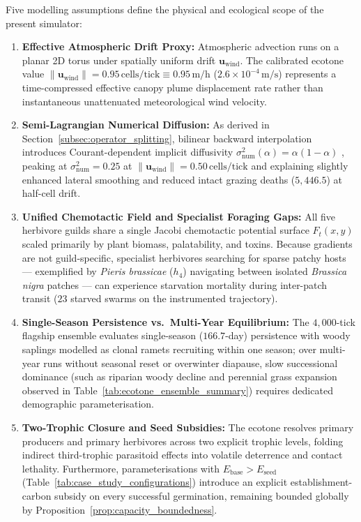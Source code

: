 Five modelling assumptions define the physical and ecological scope of the present simulator:
\begin{enumerate}
  \item \textbf{Effective Atmospheric Drift Proxy:} Atmospheric advection runs on a planar 2D torus under spatially uniform drift $\mathbf{u}_{\text{wind}}$. The calibrated ecotone value $\|\mathbf{u}_{\text{wind}}\| = 0.95\,\text{cells/tick} \equiv 0.95\,\text{m/h}$ ($2.6 \times 10^{-4}\,\text{m/s}$) represents a time-compressed effective canopy plume displacement rate rather than instantaneous unattenuated meteorological wind velocity.
  \item \textbf{Semi-Lagrangian Numerical Diffusion:} As derived in Section~\ref{subsec:operator_splitting}, bilinear backward interpolation introduces Courant-dependent implicit diffusivity $\sigma_{\text{num}}^2(\alpha) = \alpha(1 - \alpha)$ \cite{staniforth1991semi}, peaking at $\sigma_{\text{num}}^2 = 0.25$ at $\|\mathbf{u}_{\text{wind}}\| = 0.50\,\text{cells/tick}$ and explaining slightly enhanced lateral smoothing and reduced intact grazing deaths ($5{,}446.5$) at half-cell drift.
  \item \textbf{Unified Chemotactic Field and Specialist Foraging Gaps:} All five herbivore guilds share a single Jacobi chemotactic potential surface $F_t(x, y)$ scaled primarily by plant biomass, palatability, and toxins. Because gradients are not guild-specific, specialist herbivores searching for sparse patchy hosts --- exemplified by \textit{Pieris brassicae} ($h_4$) navigating between isolated \textit{Brassica nigra} patches --- can experience starvation mortality during inter-patch transit ($23$ starved swarms on the instrumented trajectory).
  \item \textbf{Single-Season Persistence vs.\ Multi-Year Equilibrium:} The $4{,}000$-tick flagship ensemble evaluates single-season ($166.7$-day) persistence with woody saplings modelled as clonal ramets recruiting within one season; over multi-year runs without seasonal reset or overwinter diapause, slow successional dominance (such as riparian woody decline and perennial grass expansion observed in Table~\ref{tab:ecotone_ensemble_summary}) requires dedicated demographic parameterisation.
  \item \textbf{Two-Trophic Closure and Seed Subsidies:} The ecotone resolves primary producers and primary herbivores across two explicit trophic levels, folding indirect third-trophic parasitoid effects into volatile deterrence and contact lethality. Furthermore, parameterisations with $E_{\text{base}} > E_{\text{seed}}$ (Table~\ref{tab:case_study_configurations}) introduce an explicit establishment-carbon subsidy on every successful germination, remaining bounded globally by Proposition~\ref{prop:capacity_boundedness}.
\end{enumerate}
